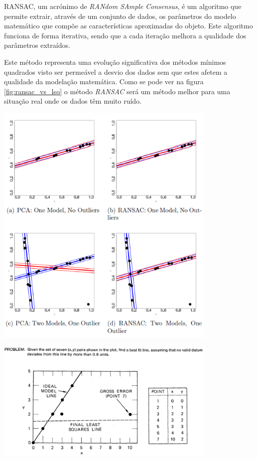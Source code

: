 RANSAC\cite{Fischler:1981:RSC:358669.358692}, um acrónimo de \emph{RANdom SAmple Consensus}, é um algoritmo que permite extrair, através de um conjunto de dados, os parâmetros do modelo matemático que compõe as características aproximadas do objeto. Este algoritmo funciona de forma iterativa, sendo que a cada iteração melhora a qualidade dos parâmetros extraídos.

Este método representa uma evolução significativa dos métodos mínimos quadrados visto ser permeável a desvio dos dados sem que estes afetem a qualidade da modelação matemática.
Como se pode ver na figura \ref{fig:ransac_vs_lsq} o método \emph{RANSAC} será um método melhor para uma situação real onde os dados têm muito ruído.


\begin{center}
	\includegraphics[width=0.80\textwidth]{figures/least_squares_vs_ransac.png}
	\label{fig:ransac_vs_lsq}
\end{center}



\begin{center}
	\includegraphics[width=0.80\textwidth]{figures/least_squares_shortcomings.png}
	\label{fig:ransac}
\end{center}


